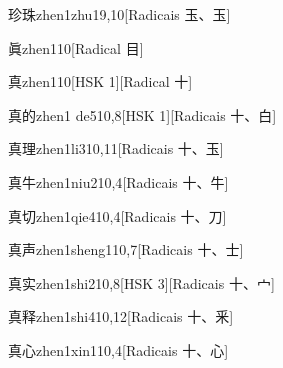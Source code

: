 \begin{entry}{珍珠}{zhen1zhu1}{9,10}[Radicais ⽟、⽟]
\end{entry}

\begin{entry}{眞}{zhen1}{10}[Radical ⽬]
\end{entry}

\begin{entry}{真}{zhen1}{10}[HSK 1][Radical ⼗]
\end{entry}

\begin{entry}{真的}{zhen1 de5}{10,8}[HSK 1][Radicais ⼗、⽩]
\end{entry}

\begin{entry}{真理}{zhen1li3}{10,11}[Radicais ⼗、⽟]
\end{entry}

\begin{entry}{真牛}{zhen1niu2}{10,4}[Radicais ⼗、⽜]
\end{entry}

\begin{entry}{真切}{zhen1qie4}{10,4}[Radicais ⼗、⼑]
\end{entry}

\begin{entry}{真声}{zhen1sheng1}{10,7}[Radicais ⼗、⼠]
\end{entry}

\begin{entry}{真实}{zhen1shi2}{10,8}[HSK 3][Radicais ⼗、⼧]
\end{entry}

\begin{entry}{真释}{zhen1shi4}{10,12}[Radicais ⼗、⾤]
\end{entry}

\begin{entry}{真心}{zhen1xin1}{10,4}[Radicais ⼗、⼼]
\end{entry}

